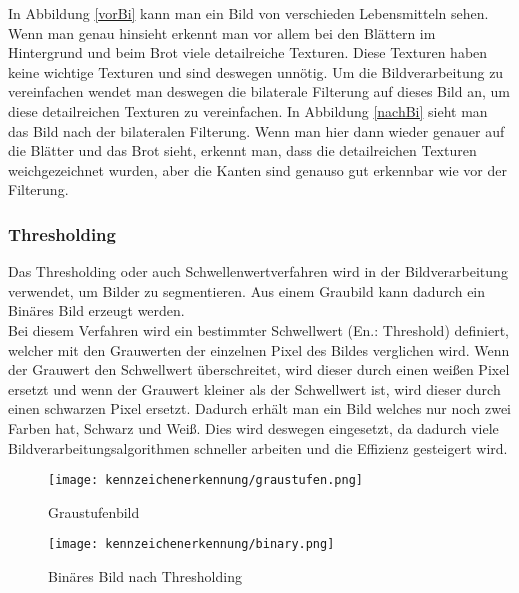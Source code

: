 In Abbildung \ref{vorBi} kann man ein Bild von verschieden Lebensmitteln sehen. Wenn man genau hinsieht 
erkennt man vor allem bei den Blättern im Hintergrund und beim Brot viele detailreiche Texturen. 
Diese Texturen haben keine wichtige Texturen und sind deswegen unnötig. Um die Bildverarbeitung zu 
vereinfachen wendet man deswegen die bilaterale Filterung auf dieses Bild an, um diese detailreichen 
Texturen zu vereinfachen. In Abbildung \ref{nachBi} sieht man das Bild nach der bilateralen Filterung. 
Wenn man hier dann wieder genauer auf die Blätter und das Brot sieht, erkennt man, dass die 
detailreichen Texturen weichgezeichnet wurden, aber die Kanten sind genauso gut erkennbar wie vor der Filterung.

\subsubsection{Thresholding}
Das Thresholding oder auch Schwellenwertverfahren wird in der Bildverarbeitung verwendet, um Bilder zu segmentieren. 
Aus einem Graubild kann dadurch ein Binäres Bild erzeugt werden.\\ 

Bei diesem Verfahren wird ein bestimmter Schwellwert (En.: Threshold) definiert, welcher mit den Grauwerten der einzelnen 
Pixel des Bildes verglichen wird. Wenn der Grauwert den Schwellwert überschreitet, wird dieser durch einen weißen Pixel 
ersetzt und wenn der Grauwert kleiner als der Schwellwert ist, wird dieser durch einen schwarzen Pixel ersetzt. 
Dadurch erhält man ein Bild welches nur noch zwei Farben hat, Schwarz und Weiß. Dies wird deswegen eingesetzt, 
da dadurch viele Bildverarbeitungsalgorithmen schneller arbeiten und die Effizienz gesteigert wird.\\

\begin{figure}[htbp]
    \centering
    \begin{minipage}[t]{0.45\linewidth}
        \centering
        \texttt{[image: kennzeichenerkennung/graustufen.png]}
        \caption{Graustufenbild}
        \label{graypic}
    \end{minipage}
    \hfill
    \begin{minipage}[t]{0.45\linewidth}
        \centering
        \texttt{[image: kennzeichenerkennung/binary.png]}
        \caption{Binäres Bild nach Thresholding}
        \label{binarypic}
    \end{minipage}
\end{figure}

